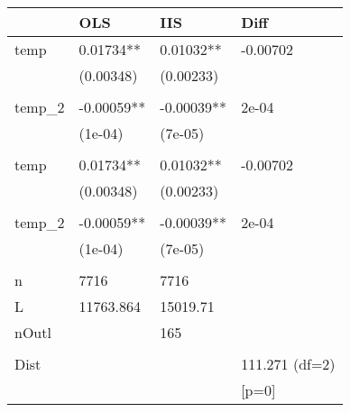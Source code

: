 \begin{table}[ht]
\centering
\begin{tabular}{llll}
  \hline
 & OLS & IIS & Diff \\ 
  \hline
temp & 0.01734** & 0.01032** & -0.00702 \\ 
   & (0.00348) & (0.00233) &  \\ 
   &  &  &  \\ 
  temp\_2 & -0.00059** & -0.00039** & 2e-04 \\ 
   & (1e-04) & (7e-05) &  \\ 
   &  &  &  \\ 
  temp & 0.01734** & 0.01032** & -0.00702 \\ 
   & (0.00348) & (0.00233) &  \\ 
   &  &  &  \\ 
  temp\_2 & -0.00059** & -0.00039** & 2e-04 \\ 
   & (1e-04) & (7e-05) &  \\ 
   &  &  &  \\ 
  n & 7716 & 7716 &  \\ 
  L & 11763.864 & 15019.71 &  \\ 
  nOutl &  & 165 &  \\ 
   &  &  &  \\ 
  Dist &  &  & 111.271 (df=2) \\ 
   &  &  & [p=0] \\ 
   \hline
\end{tabular}
\end{table}
